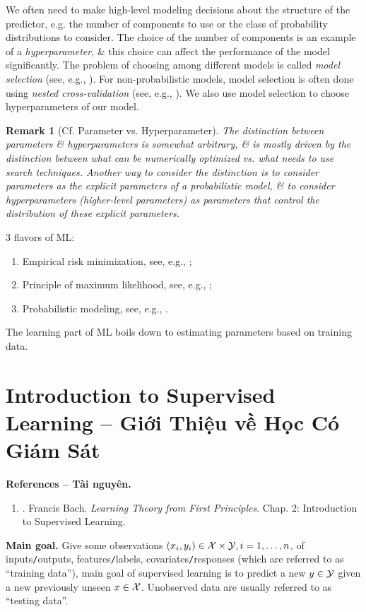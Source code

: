 \documentclass{article}
\newtheorem{remark}{Remark}
\begin{document}
We often need to make high-level modeling decisions about the structure of the predictor, e.g. the number of components to use or the class of probability distributions to consider. The choice of the number of components is an example of a {\it hyperparameter}, \& this choice can affect the performance of the model significantly. The problem of choosing among different models is called {\it model selection} (see, e.g., \cite[Sect. 8.6: Model Selection]{Deisenroth_Faisal_Ong2024}). For non-probabilistic models, model selection is often done using {\it nested cross-validation} (see, e.g., \cite[Subsect. 8.6.1: Nested Cross-Validation]{Deisenroth_Faisal_Ong2024}). We also use model selection to choose hyperparameters of our model.

\begin{remark}[Cf. Parameter vs. Hyperparameter]
	The distinction between parameters \& hyperparameters is somewhat arbitrary, \& is mostly driven by the distinction between what can be numerically optimized vs. what needs to use search techniques. Another way to consider the distinction is to consider parameters as the explicit parameters of a probabilistic model, \& to consider hyperparameters (higher-level parameters) as parameters that control the distribution of these explicit parameters.
\end{remark}
3 flavors of ML:
\begin{enumerate}
	\item Empirical risk minimization, see, e.g., \cite[Sect. 8.2: Empirical Risk Minimization]{Deisenroth_Faisal_Ong2024};
	\item Principle of maximum likelihood, see, e.g., \cite[Sect. 8.3: Parameter Estimation]{Deisenroth_Faisal_Ong2024};
	\item Probabilistic modeling, see, e.g., \cite[Sect. 8.4: Probabilistic Modeling \& Inference]{Deisenroth_Faisal_Ong2024}.
\end{enumerate}
The learning part of ML boils down to estimating parameters based on training data.


\section{Introduction to Supervised Learning -- Giới Thiệu về Học Có Giám Sát}
\textbf{\textsf{References -- Tài nguyên.}}
\begin{enumerate}
	\item \cite{Bach2024}. {\sc Francis Bach}. {\it Learning Theory from First Principles}. Chap. 2: Introduction to Supervised Learning.
\end{enumerate}
{\bf Main goal.} Give some observations $(x_i,y_i)\in{\cal X}\times{\cal Y},i = 1,\ldots,n$, of inputs{\tt/}outputs, features{\tt/}labels, covariates{\tt/}responses (which are referred to as ``training data''), main goal of supervised learning is to predict a new $y\in{\cal Y}$ given a new previously unseen $x\in{\cal X}$. Unobserved data are usually referred to as ``testing data''.
\end{document}
